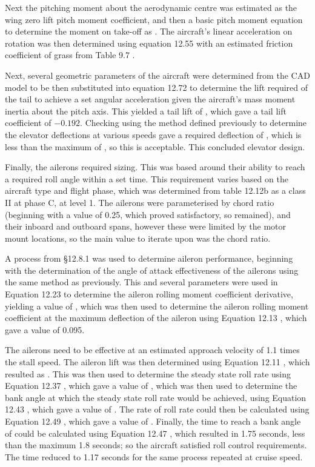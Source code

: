 \documentclass[../../main.tex]{subfiles}
\begin{document}
Next the pitching moment about the aerodynamic centre was estimated as the wing zero lift pitch moment coefficient, and then a basic pitch moment equation to determine the moment on take-off as .
The aircraft's linear acceleration on rotation was then determined using equation 12.55 \cite{sadraey-13} with an estimated friction coefficient of grass from Table 9.7 \cite{sadraey-13}. 

Next, several geometric parameters of the aircraft were determined from the CAD model to be then substituted into equation 12.72 \cite{sadraey-13} to determine the lift required of the tail to achieve a set angular acceleration given the aircraft's mass moment inertia about the pitch axis.
This yielded a tail lift of , which gave a tail lift coefficient of $-0.192$.
Checking using the method defined previously to determine the elevator deflections at various speeds gave a required deflection of , which is less than the maximum of , so this is acceptable.
This concluded elevator design. 

Finally, the ailerons required sizing.
This was based around their ability to reach a required roll angle within a set time.
This requirement varies based on the aircraft type and flight phase, which was determined from table 12.12b \cite{sadraey-13} as a class II at phase C, at level 1.
The ailerons were parameterised by chord ratio (beginning with a value of 0.25, which proved satisfactory, so remained), and their inboard and outboard spans, however these were limited by the motor mount locations, so the main value to iterate upon was the chord ratio.  

A process from \S 12.8.1 \cite{sadraey-13} was used to determine aileron performance, beginning with the determination of the angle of attack effectiveness of the ailerons using the same method as previously.
This and several parameters were used in Equation 12.23 \cite{sadraey-13} to determine the aileron rolling moment coefficient derivative, yielding a value of , which was then used to determine the aileron rolling moment coefficient at the maximum deflection of the aileron using Equation 12.13 \cite{sadraey-13}, which gave a value of 0.095. 

The ailerons need to be effective at an estimated approach velocity of 1.1 times the stall speed.
The aileron lift was then determined using Equation 12.11 \cite{sadraey-13}, which resulted as .
This was then used to determine the steady state roll rate using Equation 12.37 \cite{sadraey-13}, which gave a value of , which was then used to determine the bank angle at which the steady state roll rate would be achieved, using Equation 12.43 \cite{sadraey-13}, which gave a value of .
The rate of roll rate could then be calculated using Equation 12.49 \cite{sadraey-13}, which gave a value of .
Finally, the time to reach a bank angle of  could be calculated using Equation 12.47 \cite{sadraey-13}, which resulted in 1.75 seconds, less than the maximum 1.8 seconds; so the aircraft satisfied roll control requirements.
The time reduced to 1.17 seconds for the same process repeated at cruise speed. 
\end{document}
